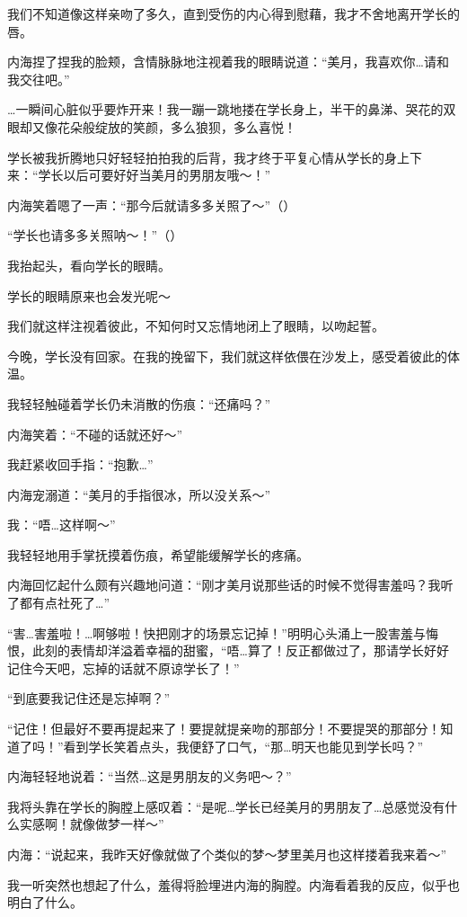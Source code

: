 我们不知道像这样亲吻了多久，直到受伤的内心得到慰藉，我才不舍地离开学长的唇。

内海捏了捏我的脸颊，含情脉脉地注视着我的眼睛说道：“美月，我喜欢你…请和我交往吧。”

…一瞬间心脏似乎要炸开来！我一蹦一跳地搂在学长身上，半干的鼻涕、哭花的双眼却又像花朵般绽放的笑颜，多么狼狈，多么喜悦！

学长被我折腾地只好轻轻拍拍我的后背，我才终于平复心情从学长的身上下来：“学长以后可要好好当美月的男朋友哦～！”

内海笑着嗯了一声：“那今后就请多多关照了～”（）

“学长也请多多关照呐～！”（）

我抬起头，看向学长的眼睛。

学长的眼睛原来也会发光呢～

我们就这样注视着彼此，不知何时又忘情地闭上了眼睛，以吻起誓。

今晚，学长没有回家。在我的挽留下，我们就这样依偎在沙发上，感受着彼此的体温。

我轻轻触碰着学长仍未消散的伤痕：“还痛吗？”

内海笑着：“不碰的话就还好～”

我赶紧收回手指：“抱歉…”

内海宠溺道：“美月的手指很冰，所以没关系～”

我：“唔…这样啊～”

我轻轻地用手掌抚摸着伤痕，希望能缓解学长的疼痛。

内海回忆起什么颇有兴趣地问道：“刚才美月说那些话的时候不觉得害羞吗？我听了都有点社死了…”

“害…害羞啦！…啊够啦！快把刚才的场景忘记掉！”明明心头涌上一股害羞与悔恨，此刻的表情却洋溢着幸福的甜蜜，“唔…算了！反正都做过了，那请学长好好记住今天吧，忘掉的话就不原谅学长了！”

“到底要我记住还是忘掉啊？”

“记住！但最好不要再提起来了！要提就提亲吻的那部分！不要提哭的那部分！知道了吗！”看到学长笑着点头，我便舒了口气，“那…明天也能见到学长吗？”

内海轻轻地说着：“当然…这是男朋友的义务吧～？”

我将头靠在学长的胸膛上感叹着：“是呢…学长已经美月的男朋友了…总感觉没有什么实感啊！就像做梦一样～”

内海：“说起来，我昨天好像就做了个类似的梦～梦里美月也这样搂着我来着～”

我一听突然也想起了什么，羞得将脸埋进内海的胸膛。内海看着我的反应，似乎也明白了什么。

